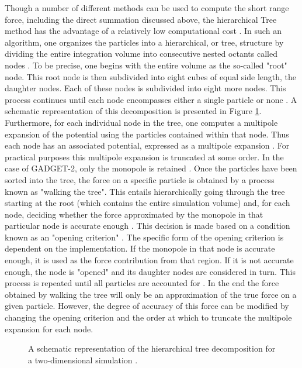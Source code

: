 \documentclass[10pt,letterpaper,final]{iopart}
\numberwithin{equation}{subsection}
\begin{document}
Though a number of different methods can be used to compute the short range force, including the direct summation discussed above, the hierarchical Tree method has the advantage of a relatively low computational cost \cite{Bernardeau}\cite{Gadget1}\cite{Gadget2}. In such an algorithm, one organizes the particles into a hierarchical, or tree, structure by dividing the entire integration volume into consecutive nested octants called nodes \cite{Gadget1}\cite{Gadget2}\cite{BH}. To be precise, one begins with the entire volume as the so-called "root" node. This root node is then subdivided into eight cubes of equal side length, the daughter nodes. Each of these nodes is subdivided into eight more nodes. This process continues until each node encompasses either a single particle or none \cite{Gadget1}\cite{Gadget2}\cite{BH}. A schematic representation of this decomposition is presented in Figure \ref{TreeFig}. Furthermore, for each individual node in the tree, one computes a multipole expansion of the potential using the particles contained within that node. Thus each node has an associated potential, expressed as a multipole expansion \cite{Gadget1}\cite{Gadget2}. For practical purposes this multipole expansion is truncated at some order. In the case of GADGET-2, only the monopole is retained \cite{Gadget1}\cite{Gadget2}. Once the particles have been sorted into the tree, the force on a specific particle is obtained by a process known as "walking the tree". This entails hierarchically going through the tree starting at the root (which contains the entire simulation volume) and, for each node, deciding whether the force approximated by the monopole in that particular node is accurate enough \cite{Gadget1}\cite{Gadget2}. This decision is made based on a condition known as an "opening criterion" \cite{Gadget1}\cite{Gadget2}. The specific form of the opening criterion is dependent on the implementation. If the monopole in that node is accurate enough, it is used as the force contribution from that region. If it is not accurate enough, the node is "opened" and its daughter nodes are considered in turn. This process is repeated until all particles are accounted for \cite{Gadget1}\cite{Gadget2}. In the end the force obtained by walking the tree will only be an approximation of the true force on a given particle. However, the degree of accuracy of this force can be modified by changing the opening criterion and the order at which to truncate the multipole expansion for each node.


\begin{figure}[h!]
\begin{center}
\caption{A schematic representation of the hierarchical tree decomposition for a two-dimensional simulation \cite{Gadget1}.}
\label{TreeFig}
\end{center}
\end{figure}
\end{document}
